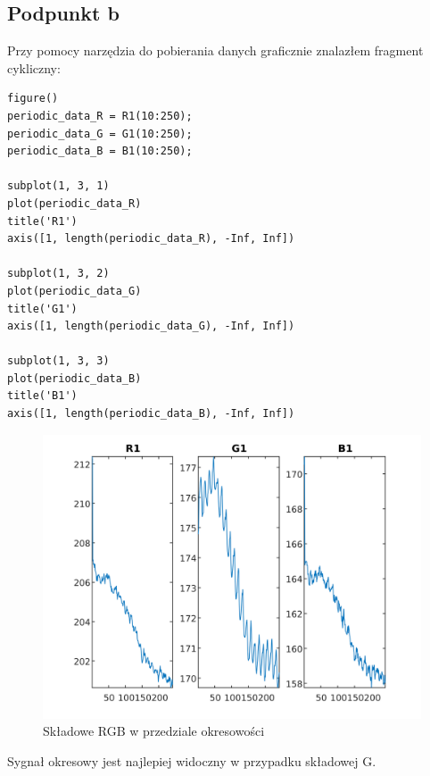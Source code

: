 \documentclass[a4paper, 12pt, titlepage]{article}
\begin{document}
        \subsection{Podpunkt b}
            Przy pomocy narzędzia do pobierania danych graficznie
            znalazłem fragment cykliczny:
\begin{lstlisting}
figure()
periodic_data_R = R1(10:250);
periodic_data_G = G1(10:250);
periodic_data_B = B1(10:250);

subplot(1, 3, 1)
plot(periodic_data_R)
title('R1')
axis([1, length(periodic_data_R), -Inf, Inf])

subplot(1, 3, 2)
plot(periodic_data_G)
title('G1')
axis([1, length(periodic_data_G), -Inf, Inf])

subplot(1, 3, 3)
plot(periodic_data_B)
title('B1')
axis([1, length(periodic_data_B), -Inf, Inf])
\end{lstlisting}
            \begin{figure}[H]
                \centering
                \includegraphics[width=0.8\columnwidth]{periodic.png}
                \caption{Składowe RGB w przedziale okresowości}
            \end{figure}\noindent
            Sygnał okresowy jest najlepiej widoczny w przypadku
            składowej G.
\end{document}
